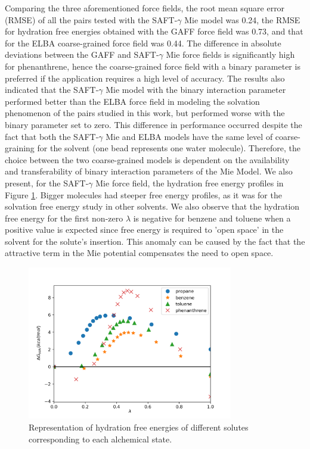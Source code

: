Comparing the three aforementioned force fields, the root mean square error (RMSE) of all the pairs tested with the SAFT-$\gamma$ Mie model was  0.24, the RMSE for hydration free energies obtained with the GAFF force field was 0.73, and that for the ELBA coarse-grained force field was 0.44. The difference in absolute deviations between the GAFF and SAFT-$\gamma$ Mie force fields is significantly high for phenanthrene, hence the coarse-grained force field with a binary parameter is preferred if the application requires a high level of accuracy. The results also indicated that the SAFT-$\gamma$ Mie model with the binary interaction parameter performed better than the ELBA force field in modeling the solvation phenomenon of the pairs studied in this work, but performed worse with the binary parameter set to zero. This difference in performance occurred despite the fact that both the SAFT-$\gamma$ Mie and ELBA models have the same level of coarse-graining for the solvent (one bead represents one water molecule). Therefore, the choice between the two coarse-grained models is dependent on the availability and transferability of binary interaction parameters of the Mie Model. We also present, for the SAFT-$\gamma$ Mie force field, the hydration free energy profiles in Figure \ref{fig:water}. Bigger molecules had steeper free energy profiles, as it was for the solvation free energy study in other solvents. We also observe that the hydration free energy for the first non-zero $\lambda$ is negative for benzene and toluene when a positive value is expected since free energy is required to 'open space' in the solvent for the solute's insertion. This anomaly can be caused by the fact that the attractive term in the Mie potential compensates the need to open space. 

\begin{figure}[H]
	\centering
	\includegraphics[width=0.8\textwidth]{Figures/water}
	\caption{Representation of hydration free energies of different solutes corresponding to each alchemical state.}
	\label{fig:water}
\end{figure}

